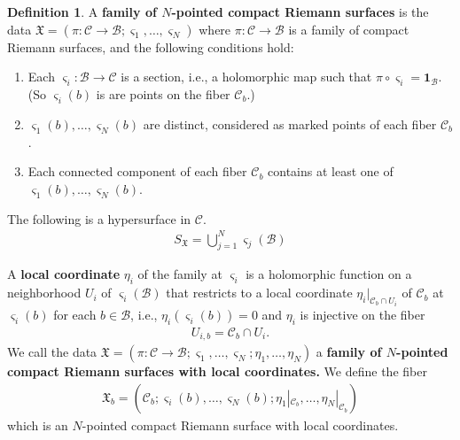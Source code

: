 \documentclass[11pt,b5paper,notitlepage]{article}
\theoremstyle{definition}
\newtheorem{df}{Definition}[section]
\theoremstyle{plain}
\newcommand{\fk}{\mathfrak}
\newcommand{\mc}{\mathcal}
\newcommand{\id}{\mathbf{1}}
\newcommand{\sgm}{\varsigma}
\newcommand{\SX}{{S_{\fk X}}}
\numberwithin{equation}{section}
\begin{document}
\begin{df}
A \textbf{family of $N$-pointed compact Riemann surfaces} is the data $\fk X=(\pi:\mc C\rightarrow\mc B;\sgm_1,\dots,\sgm_N)$ where $\pi:\mc C\rightarrow\mc B$ is a family of compact Riemann surfaces, and the following conditions hold:
\begin{enumerate}[label=(\alph*)]
\item Each $\sgm_i:\mc B\rightarrow\mc C$ is a section, i.e., a holomorphic map such that $\pi\circ\sgm_i=\id_{\mc B}$. (So $\sgm_i(b)$ is are points on the fiber $\mc C_b$.)
\item $\sgm_1(b),\dots,\sgm_N(b)$ are distinct, considered as marked points of each fiber $\mc C_b$.
\item Each connected component of each fiber $\mc C_b$ contains at least one of $\sgm_1(b),\dots,\sgm_N(b)$.
\end{enumerate}
The following is a hypersurface in $\mc C$. \index{SX@$\SX=\bigcup_{j=1}^N\sgm_j(\mc B)$}
\begin{align}\label{eq212}
\SX=\bigcup_{j=1}^N\sgm_j(\mc B)
\end{align}

A \textbf{local coordinate} $\eta_i$ of the family at $\sgm_i$ is a holomorphic function on a neighborhood $U_i$ of $\sgm_i(\mc B)$ that restricts to a local coordinate $\eta_i|_{\mc C_b\cap U_i}$ of $\mc C_b$ at $\sgm_i(b)$ for each $b\in\mc B$, i.e., $\eta_i(\sgm_i(b))=0$ and $\eta_i$ is injective on the fiber
\begin{align*}
U_{i,b}=\mc C_b\cap U_i.
\end{align*}
We call the data $\fk X=(\pi:\mc C\rightarrow\mc B;\sgm_1,\dots,\sgm_N;\eta_1,\dots,\eta_N)$ a \textbf{family of $N$-pointed compact Riemann surfaces with local coordinates.} We define the fiber \index{Xb@$\fk X_b$}
\begin{align}
\fk X_b=(\mc C_b;\sgm_i(b),\dots,\sgm_N(b);\eta_1|_{\mc C_b},\dots,\eta_N|_{\mc C_b})
\end{align}
which is an $N$-pointed compact Riemann surface with local coordinates. \hfill\qedsymbol
\end{df}



\subsection{}
\end{document}
